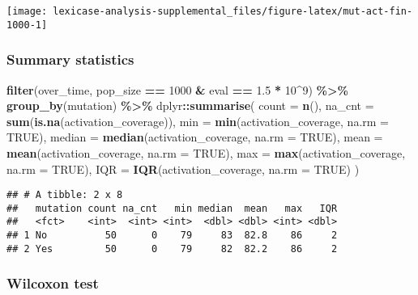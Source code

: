 \documentclass[
]{book}
\newenvironment{Shaded}{\begin{snugshade}}{\end{snugshade}}
\newcommand{\AttributeTok}[1]{\textcolor[rgb]{0.13,0.29,0.53}{#1}}
\newcommand{\ConstantTok}[1]{\textcolor[rgb]{0.56,0.35,0.01}{#1}}
\newcommand{\DecValTok}[1]{\textcolor[rgb]{0.00,0.00,0.81}{#1}}
\newcommand{\FloatTok}[1]{\textcolor[rgb]{0.00,0.00,0.81}{#1}}
\newcommand{\FunctionTok}[1]{\textcolor[rgb]{0.13,0.29,0.53}{\textbf{#1}}}
\newcommand{\NormalTok}[1]{#1}
\newcommand{\SpecialCharTok}[1]{\textcolor[rgb]{0.81,0.36,0.00}{\textbf{#1}}}
\begin{document}
\texttt{[image: lexicase-analysis-supplemental\_files/figure-latex/mut-act-fin-1000-1]}

\hypertarget{summary-statistics-5}{%
\subsubsection{Summary statistics}\label{summary-statistics-5}}

\begin{Shaded}
\begin{Highlighting}[]
\FunctionTok{filter}\NormalTok{(over\_time, pop\_size }\SpecialCharTok{==} \DecValTok{1000} \SpecialCharTok{\&}\NormalTok{ eval }\SpecialCharTok{==} \FloatTok{1.5} \SpecialCharTok{*} \DecValTok{10}\SpecialCharTok{\^{}}\DecValTok{9}\NormalTok{) }\SpecialCharTok{\%\textgreater{}\%}
  \FunctionTok{group\_by}\NormalTok{(mutation) }\SpecialCharTok{\%\textgreater{}\%}
\NormalTok{  dplyr}\SpecialCharTok{::}\FunctionTok{summarise}\NormalTok{(}
    \AttributeTok{count =} \FunctionTok{n}\NormalTok{(),}
    \AttributeTok{na\_cnt =} \FunctionTok{sum}\NormalTok{(}\FunctionTok{is.na}\NormalTok{(activation\_coverage)),}
    \AttributeTok{min =} \FunctionTok{min}\NormalTok{(activation\_coverage, }\AttributeTok{na.rm =} \ConstantTok{TRUE}\NormalTok{),}
    \AttributeTok{median =} \FunctionTok{median}\NormalTok{(activation\_coverage, }\AttributeTok{na.rm =} \ConstantTok{TRUE}\NormalTok{),}
    \AttributeTok{mean =} \FunctionTok{mean}\NormalTok{(activation\_coverage, }\AttributeTok{na.rm =} \ConstantTok{TRUE}\NormalTok{),}
    \AttributeTok{max =} \FunctionTok{max}\NormalTok{(activation\_coverage, }\AttributeTok{na.rm =} \ConstantTok{TRUE}\NormalTok{),}
    \AttributeTok{IQR =} \FunctionTok{IQR}\NormalTok{(activation\_coverage, }\AttributeTok{na.rm =} \ConstantTok{TRUE}\NormalTok{)}
\NormalTok{  )}
\end{Highlighting}
\end{Shaded}

\begin{verbatim}
## # A tibble: 2 x 8
##   mutation count na_cnt   min median  mean   max   IQR
##   <fct>    <int>  <int> <int>  <dbl> <dbl> <int> <dbl>
## 1 No          50      0    79     83  82.8    86     2
## 2 Yes         50      0    79     82  82.2    86     2
\end{verbatim}

\hypertarget{wilcoxon-test-2}{%
\subsubsection{Wilcoxon test}\label{wilcoxon-test-2}}
\end{document}
